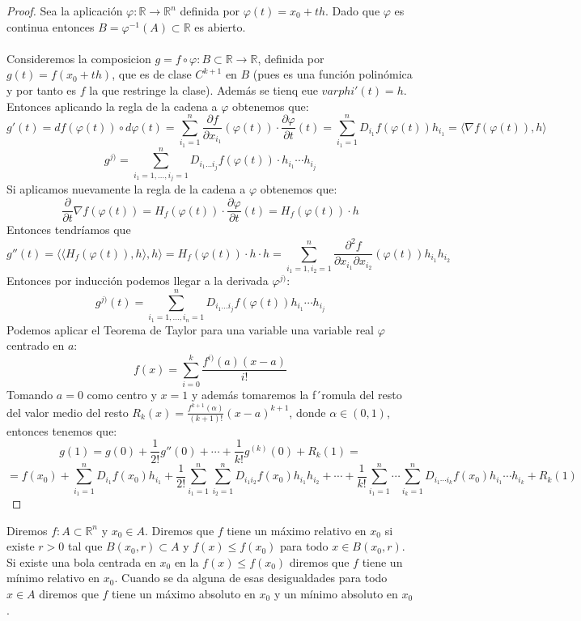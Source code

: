 \begin{proof}
    Sea la aplicación $\varphi:\mathbb{R} \to \mathbb{R}^n$ definida por $\varphi(t) = x_0 + th$. Dado que $\varphi$ es continua entonces $B = \varphi^{-1}(A) \subset \mathbb{R}$ es abierto. \\\\
    Consideremos la composicion $g =  f \circ \varphi: B \subset \mathbb{R} \to \mathbb{R}$, definida por $g(t) = f(x_0 + th)$, que es de clase $C^{k+1}$ en $B$ (pues es una función polinómica y por tanto es $f$ la que restringe la clase). Además se tienq eue $varphi'(t) = h$. Entonces aplicando la regla de la cadena a $\varphi$ obtenemos que: 
    $$g'(t) = df(\varphi(t)) \circ d\varphi(t) = \sum_{i_1 = 1}^{n} \frac{\partial f}{\partial x_{i_1}}(\varphi(t)) \cdot \frac{\partial \varphi}{\partial t}(t) = \sum_{i_1 = 1}^{n} D_{i_1}f(\varphi(t)) h_{i_1} = \langle \nabla f(\varphi(t)), h \rangle$$
    $$ g^{j)} = \sum_{i_1 = 1, \ldots, i_j = 1}^{n} D_{i_1 \ldots i_j}f(\varphi(t)) \cdot h_{i_1} \cdots h_{i_j}$$
    Si aplicamos nuevamente la regla de la cadena a $\varphi$ obtenemos que: 
    $$\frac{\partial}{\partial t} \nabla f(\varphi(t)) = H_f(\varphi(t)) \cdot \frac{\partial \varphi}{\partial t}(t) = H_f(\varphi(t)) \cdot h$$
    Entonces tendríamos que $$g''(t) = \langle \langle H_f(\varphi(t)), h \rangle, h \rangle = H_f(\varphi(t)) \cdot h \cdot h = \sum_{i_1 = 1, i_2 = 1}^{n} \frac{\partial^2 f}{\partial x_{i_1} \partial x_{i_2}}(\varphi(t)) h_{i_1} h_{i_2}$$
    Entonces por inducción podemos llegar a la derivada $\varphi^{j)}$:
    $$g^{j)}(t) = \sum_{i_1 = 1, \ldots, i_n = 1}^{n} D_{i_1 \ldots i_j}f(\varphi(t)) h_{i_1} \cdots h_{i_j}$$
    Podemos aplicar el Teorema de Taylor para una variable una variable real $\varphi$ centrado en $a$: 
    $$f(x) = \sum_{i = 0}^{k} \frac{f^{i)}(a)(x - a)}{i!}$$
    Tomando $a = 0$ como centro y $x = 1$ y además tomaremos la f´romula del resto del valor medio del resto $R_k(x) = \frac{f^{k+1}(\alpha)}{(k+1)!}(x - a)^{k+1}$, donde $\alpha \in (0,1)$, entonces tenemos que: 
    $$g(1) = g(0) + \frac{1}{2!} g''(0) + \cdots + \frac{1}{k!} g^{(k)}(0) + R_k(1) = $$
    $$ = f(x_0) + \sum_{i_1=1}^n D_{i_1}f(x_0) h_{i_1} + \frac{1}{2!} \sum_{i_1=1}^n \sum_{i_2=1}^n D_{i_1 i_2}f(x_0) h_{i_1} h_{i_2} + \cdots + \frac{1}{k!} \sum_{i_1=1}^n \cdots \sum_{i_k=1}^n D_{i_1 \cdots i_k}f(x_0) h_{i_1} \cdots h_{i_k} + R_k(1)$$

\end{proof}
\begin{definición}
    Diremos $f: A \subset \mathbb{R}^n$ y $x_0 \in A$. Diremos que $f$ tiene un máximo relativo en $x_0$ si existe $r > 0$ tal que $B(x_0, r) \subset A$ y $f(x) \leq f(x_0)$ para todo $x \in B(x_0, r)$. Si existe una bola centrada en $x_0$ en la $f(x) \leq f(x_0)$ diremos que $f$ tiene un mínimo relativo en $x_0$. Cuando se da alguna de esas desigualdades para todo $x \in A$ diremos que $f$ tiene un máximo absoluto en $x_0$ y un mínimo absoluto en $x_0$.
\end{definición}

